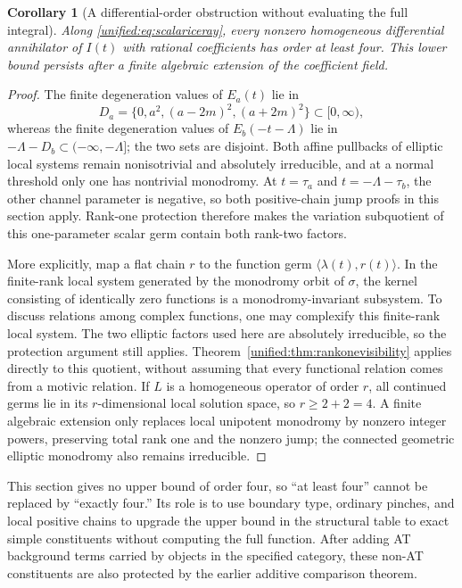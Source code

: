 \documentclass[11pt,a4paper,oneside]{article}
\theoremstyle{plain}
\newtheorem{corollary}[theorem]{Corollary}
\theoremstyle{definition}
\theoremstyle{remark}
\numberwithin{equation}{section}
\begin{document}
\begin{corollary}[A differential-order obstruction without evaluating the full integral]\label{unified:cor:scalariceorder}
Along \eqref{unified:eq:scalariceray}, every nonzero homogeneous differential annihilator of $I(t)$
with rational coefficients has order at least four. This lower bound persists after a finite algebraic extension of the coefficient field.
\end{corollary}
\begin{proof}
The finite degeneration values of $E_a(t)$ lie in
\[
 D_a=\{0,a^2,(a-2m)^2,(a+2m)^2\}\subset[0,\infty),
\]
whereas the finite degeneration values of $E_b(-t-\Lambda)$ lie in
$-\Lambda-D_b\subset(-\infty,-\Lambda]$; the two sets are disjoint.
Both affine pullbacks of elliptic local systems remain nonisotrivial and absolutely irreducible,
and at a normal threshold only one has nontrivial monodromy.
At $t=\tau_a$ and $t=-\Lambda-\tau_b$,
the other channel parameter is negative, so both positive-chain jump proofs in this section apply.
Rank-one protection therefore makes the variation subquotient of this one-parameter scalar germ contain both rank-two factors.

More explicitly, map a flat chain $r$ to the function germ $\langle\lambda(t),r(t)\rangle$.
In the finite-rank local system generated by the monodromy orbit of $\sigma$,
the kernel consisting of identically zero functions is a monodromy-invariant subsystem.
To discuss relations among complex functions, one may complexify this finite-rank local system.
The two elliptic factors used here are absolutely irreducible, so the protection argument still applies.
Theorem~\ref{unified:thm:rankonevisibility} applies directly to this quotient,
without assuming that every functional relation comes from a motivic relation.
If $L$ is a homogeneous operator of order $r$, all continued germs lie in its $r$-dimensional local solution space,
so $r\geq2+2=4$.
A finite algebraic extension only replaces local unipotent monodromy by nonzero integer powers,
preserving total rank one and the nonzero jump; the connected geometric elliptic monodromy also remains irreducible.
\end{proof}

This section gives no upper bound of order four, so ``at least four'' cannot be replaced by ``exactly four.''
Its role is to use boundary type, ordinary pinches, and local positive chains
to upgrade the upper bound in the structural table to exact simple constituents without computing the full function.
After adding AT background terms carried by objects in the specified category, these non-AT constituents are also protected by the earlier additive comparison theorem.
\end{document}
